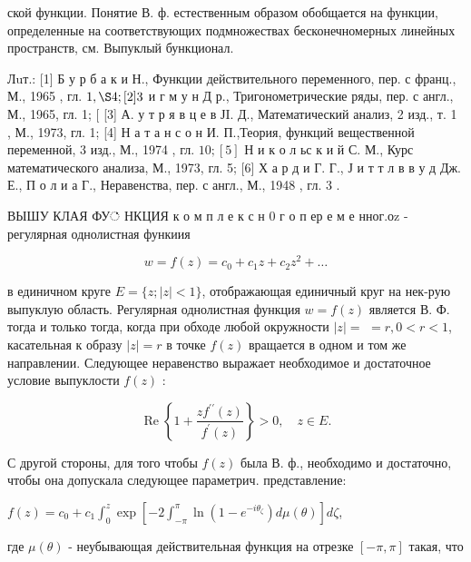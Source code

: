 \documentclass[10pt]{article}
\begin{document}
ской функции. Понятие В. ф. естественным образом обобщается на функции, определенные на соответствующих подмножествах бесконечномерных линейных пространств, см. Выпуклый бункционал.



Лuт.: [1] Б у р б а к и Н., Функции действительного переменного, пер. с франц., М., 1965 , гл. $1, \S 4 ;[2] 3$ и г м у н Д р., Тригонометрические ряды, пер. с англ., М., 1965, гл. 1; [ [3] А. у т р я в ц е в ЈI. Д., Математический анализ, 2 изд., т. 1 , М., 1973, гл. 1; [4] Н а т а н с о н И. П.,Теория, функций вещественной переменной, 3 изд., М., 1974 , гл. $10 ;[5]$ Н и к о л ьс к и й С. М., Курс математического анализа, М., 1973, гл. 5; [6] Х а р д и Г. Г., Ј и т т л в в у д Дж. Е., П о л и а Г., Неравенства, пер. с англ., М., 1948 , гл. 3 .



ВЫШУ КЛАЯ ФУ் НКЦИЯ $к$ о м п л е к с н 0 г о п ер е м е нног.оz - регулярная однолистная функиия



\[

w=f(z)=c_{0}+c_{1} z+c_{2} z^{2}+\ldots

\]



в единичном круге $E=\{z ;|z|<1\}$, отображающая единичный круг на нек-рую выпуклую область. Регулярная однолистная функция $w=f(z)$ является В. Ф. тогда и только тогда, когда при обходе любой окружности $|z|=$ $=r, 0<r<1$, касательная к образу $|z|=r$ в точке $f(z)$ вращается в одном и том же направлении. Следующее неравенство выражает необходимое и достаточное условие выпуклости $f(z)$ :



\[

\operatorname{Re}\left\{1+\frac{z f^{\prime \prime}(z)}{f^{\prime}(z)}\right\}>0, \quad z \in E .

\]



С другой стороны, для того чтобы $f(z)$ была В. ф., необходимо и достаточно, чтобы она допускала следующее параметрич. представление:



$f(z)=c_{0}+c_{1} \int_{0}^{z} \exp \left[-2 \int_{-\pi}^{\pi} \ln \left(1-e^{-i \theta_{\zeta}}\right) d \mu(\theta)\right] d \zeta$,



где $\mu(\theta)$ - неубывающая действительная функция на отрезке $[-\pi, \pi]$ такая, что
\end{document}
